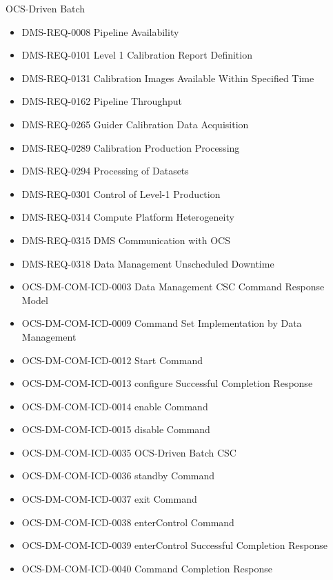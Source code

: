 OCS-Driven Batch \begin{itemize}
\item DMS-REQ-0008 Pipeline Availability
\item DMS-REQ-0101 Level 1 Calibration Report Definition
\item DMS-REQ-0131 Calibration Images Available Within Specified Time
\item DMS-REQ-0162 Pipeline Throughput
\item DMS-REQ-0265 Guider Calibration Data Acquisition
\item DMS-REQ-0289 Calibration Production Processing
\item DMS-REQ-0294 Processing of Datasets
\item DMS-REQ-0301 Control of Level-1 Production
\item DMS-REQ-0314 Compute Platform Heterogeneity
\item DMS-REQ-0315 DMS Communication with OCS
\item DMS-REQ-0318 Data Management Unscheduled Downtime
\item OCS-DM-COM-ICD-0003 Data Management CSC Command Response Model
\item OCS-DM-COM-ICD-0009 Command Set Implementation by Data Management
\item OCS-DM-COM-ICD-0012 Start Command
\item OCS-DM-COM-ICD-0013 configure Successful Completion Response
\item OCS-DM-COM-ICD-0014 enable Command
\item OCS-DM-COM-ICD-0015 disable Command
\item OCS-DM-COM-ICD-0035 OCS-Driven Batch CSC
\item OCS-DM-COM-ICD-0036 standby Command
\item OCS-DM-COM-ICD-0037 exit Command
\item OCS-DM-COM-ICD-0038 enterControl Command
\item OCS-DM-COM-ICD-0039 enterControl Successful Completion Response
\item OCS-DM-COM-ICD-0040 Command Completion Response
\end{itemize}
